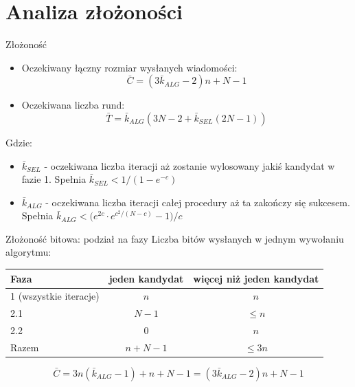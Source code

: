 \section{Analiza złożoności}

\begin{frame}{Złożoność}
  \begin{itemize}[<+->]
    \item Oczekiwany łączny rozmiar wysłanych wiadomości:
    $$ \bar{C} = (3\bar{k}_{ALG}-2)n + N - 1 $$
    \item Oczekiwana liczba rund:
    $$ \bar{T} = \bar{k}_{ALG}(3N - 2 + \bar{k}_{SEL}(2N-1)) $$
  \end{itemize}
  Gdzie:
  \begin{itemize}
    \item $\bar{k}_{SEL}$ - oczekiwana liczba iteracji aż zostanie wylosowany jakiś kandydat w fazie 1. Spełnia $\bar{k}_{SEL} < 1/(1-e^{-c})$
    \item $\bar{k}_{ALG}$ - oczekiwana liczba iteracji całej procedury aż ta zakończy się sukcesem. Spełnia $\bar{k}_{ALG} < \bigl(e^{2c} \cdot e^{c^{2}/(N - c)} - 1\bigr)/c$
    \end{itemize}
\end{frame}

\begin{frame}{Złożoność bitowa: podział na fazy}
  Liczba bitów wysłanych w jednym wywołaniu algorytmu:
  \medskip
  \begin{center}
    \renewcommand{\arraystretch}{1.3}
    \begin{tabular}{lcc}
      \hline
      Faza & jeden kandydat & więcej niż jeden kandydat \\
      \hline
      1 (wszystkie iteracje) & $n$     & $n$        \\
      2.1                    & $N - 1$ & $\leq n$   \\
      2.2                    & $0$     & $n$        \\
      \hline
      Razem                  & $n + N - 1$ & $\leq 3n$ \\
      \hline
    \end{tabular}
  \end{center}
  \pause
  \[
    \bar{C} = 3n(\bar{k}_{ALG} - 1) + n + N - 1 = (3\bar{k}_{ALG} - 2)n + N - 1
  \]
\end{frame}

